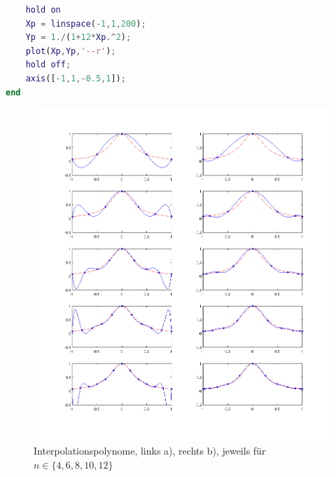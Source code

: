 \documentclass{mywork}
\begin{document}
\begin{aufgabe}
\begin{lstlisting}[language=matlab]
    % Funktion f(x)
    hold on
    Xp = linspace(-1,1,200);
    Yp = 1./(1+12*Xp.^2);
    plot(Xp,Yp,'--r');   
    hold off;
    axis([-1,1,-0.5,1]);
end
	\end{lstlisting}
		\begin{figure}[h]
			\centering
			\caption{Interpolationspolynome, links a), rechts b), jeweils für $n\in\{4,6,8,10,12\}$}
			\includegraphics[scale=0.6]{num1_1_4}
		\end{figure}
\end{aufgabe}
\end{document}
